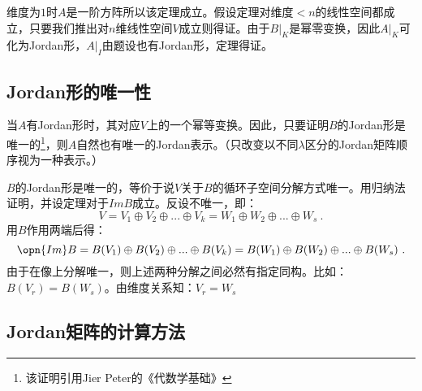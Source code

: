 维度为$1$时$A$是一阶方阵所以该定理成立。假设定理对维度$<n$的线性空间都成立，只要我们推出对$n$维线性空间$V$成立则得证。由于$B|_K$是幂零变换，因此$A|_K$可化为Jordan形，$A|_I$由题设也有Jordan形，定理得证。
\subsection{Jordan形的唯一性}
当$A$有Jordan形时，其对应$V$上的一个幂等变换。因此，只要证明$B$的Jordan形是唯一的\footnote{该证明引用Jier Peter的《代数学基础》}，则$A$自然也有唯一的Jordan表示。（只改变以不同$\lambda$区分的Jordan矩阵顺序视为一种表示。）

$B$的Jordan形是唯一的，等价于说$V$关于$B$的循环子空间分解方式唯一。用归纳法证明，并设定理对于$Im B$成立。反设不唯一，即：
\begin{equation}
V=V_1\oplus V_2\oplus...\oplus V_k=W_1\oplus W_2\oplus...\oplus W_s~.
\end{equation}
用$B$作用两端后得：
\begin{equation}
\opn{Im}B=B(V_1)\oplus B(V_2)\oplus...\oplus B(V_k)=B(W_1)\oplus B(W_2)\oplus...\oplus B(W_s)~.
\end{equation}
由于在像上分解唯一，则上述两种分解之间必然有指定同构。比如：$B(V_r)=B(W_s)$。由维度关系知：$V_r=W_s$
\subsection{Jordan矩阵的计算方法}
